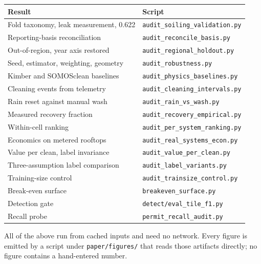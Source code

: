 \documentclass[10pt,twocolumn]{article}
\begin{document}
\begin{center}\footnotesize
\setlength{\tabcolsep}{4pt}
\begin{tabular}{@{}>{\raggedright\arraybackslash}p{}l@{}}
\toprule
Result & Script \\
\midrule
Fold taxonomy, leak measurement, 0.622 & \texttt{audit\_soiling\_validation.py} \\
Reporting-basis reconciliation         & \texttt{audit\_reconcile\_basis.py} \\
Out-of-region, year axis restored      & \texttt{audit\_regional\_holdout.py} \\
Seed, estimator, weighting, geometry   & \texttt{audit\_robustness.py} \\
Kimber and SOMOSclean baselines        & \texttt{audit\_physics\_baselines.py} \\
Cleaning events from telemetry         & \texttt{audit\_cleaning\_intervals.py} \\
Rain reset against manual wash         & \texttt{audit\_rain\_vs\_wash.py} \\
Measured recovery fraction             & \texttt{audit\_recovery\_empirical.py} \\
Within-cell ranking                    & \texttt{audit\_per\_system\_ranking.py} \\
Economics on metered rooftops          & \texttt{audit\_real\_systems\_econ.py} \\
Value per clean, label invariance      & \texttt{audit\_value\_per\_clean.py} \\
Three-assumption label comparison      & \texttt{audit\_label\_variants.py} \\
Training-size control                  & \texttt{audit\_trainsize\_control.py} \\
Break-even surface                     & \texttt{breakeven\_surface.py} \\
\midrule
Detection gate                         & \texttt{detect/eval\_tile\_f1.py} \\
Recall probe                           & \texttt{permit\_recall\_audit.py} \\
\bottomrule
\end{tabular}
\end{center}

\noindent
All of the above run from cached inputs and need no network. Every figure is emitted by a
script under \texttt{paper/figures/} that reads those artifacts directly; no figure
contains a hand-entered number.
\end{document}

